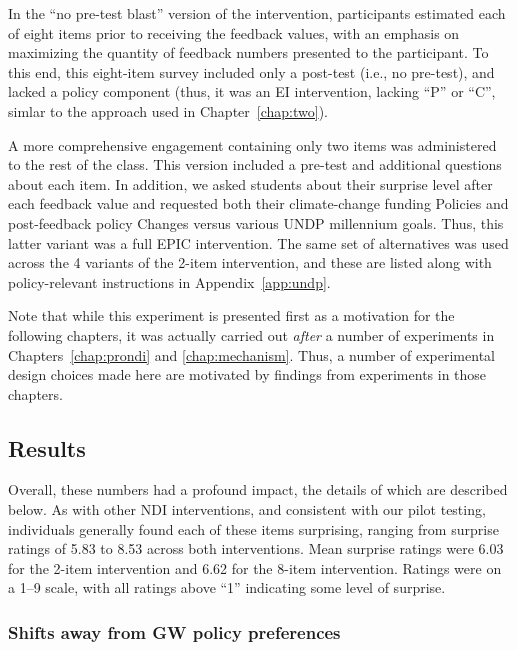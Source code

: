 In the “no pre-test blast” version of the intervention, participants estimated
each of eight items prior to receiving the feedback values, with an emphasis on
maximizing the quantity of feedback numbers presented to the participant. To
this end, this eight-item survey included only a post-test (i.e., no pre-test),
and lacked a policy component (thus, it was an EI intervention, lacking ``P'' or
``C'', simlar to the approach used in Chapter~\ref{chap:two}). 

A more comprehensive engagement containing only two items was administered to
the rest of the class. This version included a pre-test and additional questions
about each item. In addition, we asked students about their surprise level after
each feedback value and requested both their climate-change funding Policies and
post-feedback policy Changes versus various UNDP millennium goals.  Thus, this
latter variant was a full EPIC intervention. The same set of alternatives was
used across the 4 variants of the 2-item intervention, and these are listed
along with policy-relevant instructions in Appendix~\ref{app:undp}.

Note that while this experiment is presented first as a motivation for the
following chapters, it was actually carried out \emph{after} a number of
experiments in Chapters~\ref{chap:prondi} and \ref{chap:mechanism}. Thus, a
number of experimental design choices made here are motivated by findings from
experiments in those chapters.

\subsection{Results}

Overall, these numbers had a profound impact, the details of which are described
below. As with other NDI interventions, and consistent with our pilot testing,
individuals generally found each of these items surprising, ranging from
surprise ratings of 5.83 to 8.53 across both interventions. Mean surprise
ratings were 6.03 for the 2-item intervention and 6.62 for the 8-item
intervention. Ratings were on a 1--9 scale, with all ratings above “1”
indicating some level of surprise.

\subsubsection{Shifts away from GW policy preferences}

